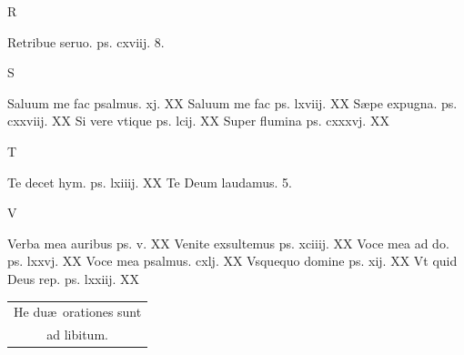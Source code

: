 \documentclass[a5paper,10pt]{book}
\def\ae{æ}
\begin{document}
\begin{multicols}{2}
\begin{center}
\color{red} R
\end{center}
\vspace{-.75em}
\par \noindent Retribue seruo. ps. cxviij. \hfill 8.
\newline \vspace{-1.75em}
\begin{center}
\color{red} S
\end{center}
\vspace{-.75em}
\par \noindent Saluum me fac psalmus. xj. \hfill XX
\newline Saluum me fac ps. lxviij. \hfill XX
\newline S\ae pe expugna. ps. cxxviij. \hfill XX
\newline Si vere vtique ps. lcij. \hfill XX
\newline Super flumina ps. cxxxvj. \hfill XX
\newline \vspace{-1.75em}
\begin{center}
\color{red} T
\end{center}
\vspace{-.75em}
\par \noindent Te decet hym. ps. lxiiij. \hfill XX
\newline Te Deum laudamus. \hfill 5.
\newline \vspace{-1.75em}
\begin{center}
\color{red} V
\end{center}
\vspace{-.75em}
\par \noindent Verba mea auribus ps. v. \hfill XX
\newline Venite exsultemus ps. xciiij. \hfill XX%
\newline Voce mea ad do. ps. lxxvj. \hfill XX
\newline Voce mea psalmus. cxlj. \hfill XX
\newline Vsquequo domine ps. xij. \hfill XX
\newline Vt quid Deus rep. ps. lxxiij. \hfill XX
\begin{center}
\begin{tabular}{l r}
\multicolumn{2}{c}{He du\ae \ orationes sunt}\\
\multicolumn{2}{c}{ad libitum.}
\end{tabular}
\end{center}
\end{multicols}
\end{document}
